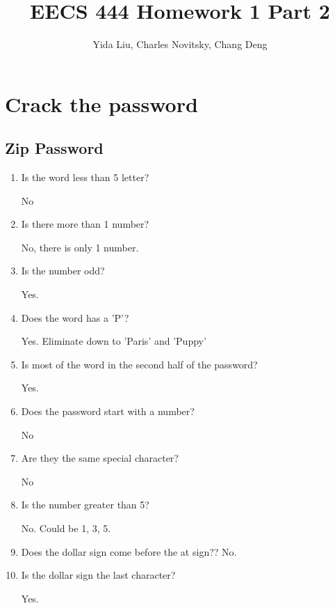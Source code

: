 \documentclass[11pt]{article}
\begin{document}
\author{Yida Liu, Charles Novitsky, Chang Deng}
\title{EECS 444 Homework 1 Part 2}
\maketitle

\section{Crack the password}

\subsection{Zip Password}



\begin{enumerate}
    \item Is the word less than 5 letter? \par
    No
    \item Is there more than 1 number? \par
    No, there is only 1 number.
    \item Is the number odd? \par
    Yes.
    \item Does the word has a 'P'? \par
    Yes. Eliminate down to 'Paris' and 'Puppy'
    \item Is most of the word in the second half of the password?\par
    Yes.
    \item Does the password start with a number? \par
    No
    \item Are they the same special character? \par
    No
    \item Is the number greater than 5? \par
    No. Could be 1, 3, 5.
    \item Does the dollar sign come before the at sign??
    No.
    \item Is the dollar sign the last character? \par
    Yes. 
\end{enumerate}
\end{document}
